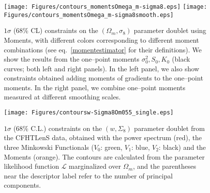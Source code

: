 \documentclass[reprint,aps,prd,superscriptaddress,showkeys,showpacs]{revtex4-1}
\begin{document}
\begin{figure*}
\begin{center}
\texttt{[image: Figures/contours\_momentsOmega\_m-sigma8.eps]}
\texttt{[image: Figures/contours\_momentsOmega\_m-sigma8smooth.eps]}
\end{center}
\caption{$1\sigma$ (68\% CL) constraints on the $(\Omega_m,\sigma_8)$
  parameter doublet using Moments, with different colors corresponding
  to different moment combinations (see eq.~\ref{momentestimator} for
  their definitions). We show the results from the one--point moments
  $\sigma_0^2,S_0,K_0$ (black curves; both left and right panels). In
  the left panel, we also show constraints obtained adding moments of
  gradients to the one--point moments. In the right panel, we combine
  one--point moments measured at different smoothing scales. }
\label{contoursMoments}
\end{figure*}

\begin{figure}
\begin{center}
\texttt{[image: Figures/contoursw-Sigma8Om055\_single.eps]}
\end{center}
\caption{$1\sigma$ (68\% C.L.) constraints on the $(w,\Sigma_8)$
  parameter doublet from the CFHTLenS data, obtained with the power
  spectrum (red), the three Minkowski Functionals ($V_0$: green,
  $V_1$: blue, $V_2$: black) and the Moments (orange).
   The contours are calculated from the parameter likelihood function
   $\mathcal{L}$ marginalized over $\Omega_m$, and the parentheses
   near the descriptor label refer to the number of principal
   components.}
\label{contours3singleRep}
\end{figure}
\end{document}
